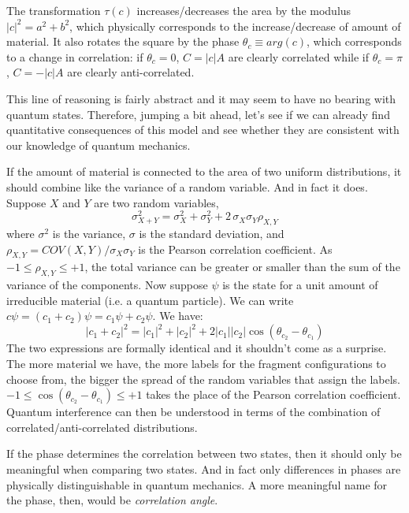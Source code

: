 \documentclass[aps,pra,10pt,twocolumn,floatfix,nofootinbib]{revtex4-1}
\numberwithin{equation}{section}
\theoremstyle{definition}
\begin{document}
The transformation $\tau(c)$ increases/decreases the area by the modulus $|c|^2=a^2+b^2$, which physically corresponds to the increase/decrease of amount of material. It also rotates the square by the phase $\theta_c \equiv arg(c)$, which corresponds to a change in correlation: if $\theta_c = 0$, $C = |c| A$ are clearly correlated while if $\theta_c = \pi$, $C = - |c| A$ are clearly anti-correlated.

This line of reasoning is fairly abstract and it may seem to have no bearing with quantum states. Therefore, jumping a bit ahead, let's see if we can already find quantitative consequences of this model and see whether they are consistent with our knowledge of quantum mechanics.

If the amount of material is connected to the area of two uniform distributions, it should combine like the variance of a random variable. And in fact it does. Suppose $X$ and $Y$ are two random variables,
\begin{equation}\label{eqn:correlation}
\sigma^2_{X+Y} = \sigma^2_{X} + \sigma^2_{Y} + 2 \, \sigma_{X} \sigma_{Y} \rho_{X,Y}
\end{equation}
where $\sigma^2$ is the variance, $\sigma$ is the standard deviation, and $\rho_{X,Y}=COV(X,Y)/\sigma_{X} \sigma_{Y}$ is the Pearson correlation coefficient. As $-1\leq\rho_{X,Y}\leq+1$, the total variance can be greater or smaller than the sum of the variance of the components. Now suppose $\psi$ is the state for a unit amount of irreducible material (i.e. a quantum particle). We can write $c \psi = (c_1 + c_2) \psi = c_1 \psi + c_2 \psi$. We have:
\begin{equation}\label{eqn:correlation_state}
|c_1+c_2|^2=|c_1|^2 + |c_2|^2 + 2 |c_1||c_2|\cos(\theta_{c_2} - \theta_{c_1})
\end{equation}
The two expressions are formally identical and it shouldn't come as a surprise. The more material we have, the more labels for the fragment configurations to choose from, the bigger the spread of the random variables that assign the labels. $-1\leq\cos(\theta_{c_2} - \theta_{c_1})\leq+1$ takes the place of the Pearson correlation coefficient. Quantum interference can then be understood in terms of the combination of correlated/anti-correlated distributions.

If the phase determines the correlation between two states, then it should only be meaningful when comparing two states. And in fact only differences in phases are physically distinguishable in quantum mechanics. A more meaningful name for the phase, then, would be \emph{correlation angle}.
\end{document}
